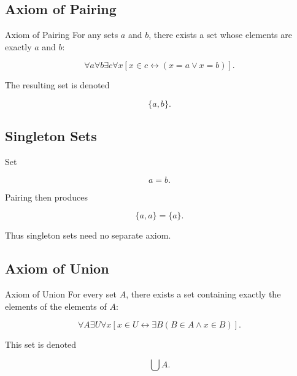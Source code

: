 \subsection{Axiom of Pairing}
\label{subsec:axiom-pairing}

\begin{definitionbox}{Axiom of Pairing}
For any sets \(a\) and \(b\), there exists a set whose elements are exactly
\(a\) and \(b\):

\[
\boxed{
\forall a\forall b
\exists c
\forall x
\left[
x\in c
\leftrightarrow
(x=a\lor x=b)
\right].
}
\]
\end{definitionbox}

The resulting set is denoted

\[
\boxed{
\{a,b\}.
}
\]

\subsection{Singleton Sets}
\label{subsec:singleton-construction}

Set

\[
a=b.
\]

Pairing then produces

\[
\boxed{
\{a,a\}
=
\{a\}.
}
\]

Thus singleton sets need no separate axiom.

\subsection{Axiom of Union}
\label{subsec:axiom-union}

\begin{definitionbox}{Axiom of Union}
For every set \(A\), there exists a set containing exactly the elements of
the elements of \(A\):

\[
\boxed{
\forall A
\exists U
\forall x
\left[
x\in U
\leftrightarrow
\exists B
(B\in A\land x\in B)
\right].
}
\]
\end{definitionbox}

This set is denoted

\[
\boxed{
\bigcup A.
}
\]

